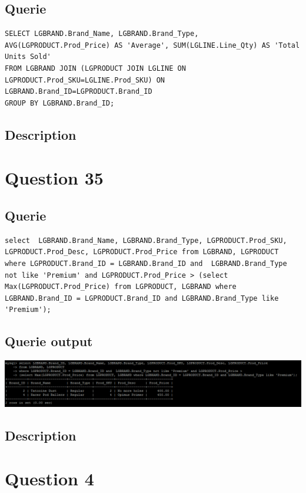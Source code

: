 \documentclass[a4paper,10pt]{article}
\begin{document}
 \subsection{Querie}
          \lstset{
            language=SQL,
            breaklines=true
            }
        \begin{lstlisting}[frame=single]
        SELECT LGBRAND.Brand_Name, LGBRAND.Brand_Type, AVG(LGPRODUCT.Prod_Price) AS 'Average', SUM(LGLINE.Line_Qty) AS 'Total Units Sold'
FROM LGBRAND JOIN (LGPRODUCT JOIN LGLINE ON LGPRODUCT.Prod_SKU=LGLINE.Prod_SKU) ON LGBRAND.Brand_ID=LGPRODUCT.Brand_ID
GROUP BY LGBRAND.Brand_ID;

        \end{lstlisting}
\subsection{Description}\section*{Question 35}
 \subsection{Querie}
          \lstset{
            language=SQL,
            breaklines=true
            }
        \begin{lstlisting}[frame=single]
        select  LGBRAND.Brand_Name, LGBRAND.Brand_Type, LGPRODUCT.Prod_SKU, LGPRODUCT.Prod_Desc, LGPRODUCT.Prod_Price from LGBRAND, LGPRODUCT where LGPRODUCT.Brand_ID = LGBRAND.Brand_ID and  LGBRAND.Brand_Type not like 'Premium' and LGPRODUCT.Prod_Price > (select Max(LGPRODUCT.Prod_Price) from LGPRODUCT, LGBRAND where LGBRAND.Brand_ID = LGPRODUCT.Brand_ID and LGBRAND.Brand_Type like 'Premium');

        \end{lstlisting}
\subsection{Querie output}
           \includegraphics{Queries/Question_35/Question35.PNG}
\subsection{Description}\section*{Question 4}
\end{document}
